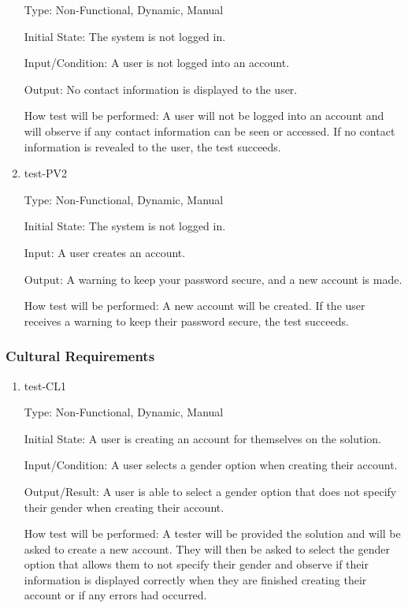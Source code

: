 \documentclass[12pt, titlepage]{article}
\begin{document}
\begin{enumerate}
  Type: Non-Functional, Dynamic, Manual

  Initial State: The system is not logged in.

  Input/Condition: A user is not logged into an account.

  Output: No contact information is displayed to the user.

  How test will be performed: A user will not be logged into an account and will
  observe if any contact information can be seen or accessed. If no contact information
  is revealed to the user, the test succeeds.

  \item{test-PV2\\}

  Type: Non-Functional, Dynamic, Manual

  Initial State: The system is not logged in.

  Input: A user creates an account.

  Output: A warning to keep your password secure, and a new account is made.

  How test will be performed: A new account will be created. If the user 
  receives a warning to keep their password secure, the test succeeds.

\end{enumerate}

\subsubsection{Cultural Requirements}

\begin{enumerate}

  \item{test-CL1\\}

  Type: Non-Functional, Dynamic, Manual

  Initial State: A user is creating an account for themselves on the solution.

  Input/Condition: A user selects a gender option when creating their account.

  Output/Result: A user is able to select a gender option that does not specify their
  gender when creating their account.

  How test will be performed: A tester will be provided the solution and will be asked
  to create a new account. They will then be asked to select the gender option that allows
  them to not specify their gender and observe if their information is displayed correctly
  when they are finished creating their account or if any errors had occurred.

\end{enumerate}
\end{document}
